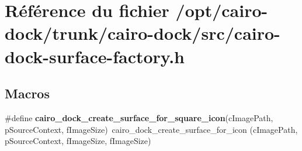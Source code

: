 \section{Référence du fichier /opt/cairo-dock/trunk/cairo-dock/src/cairo-dock-surface-factory.h}
\label{cairo-dock-surface-factory_8h}
\subsection*{Macros}
\begin{CompactItemize}
\item 
\#define {\bf cairo\_\-dock\_\-create\_\-surface\_\-for\_\-square\_\-icon}(cImagePath, pSourceContext, fImageSize)~cairo\_\-dock\_\-create\_\-surface\_\-for\_\-icon (cImagePath, pSourceContext, fImageSize, fImageSize)
\end{CompactItemize}
